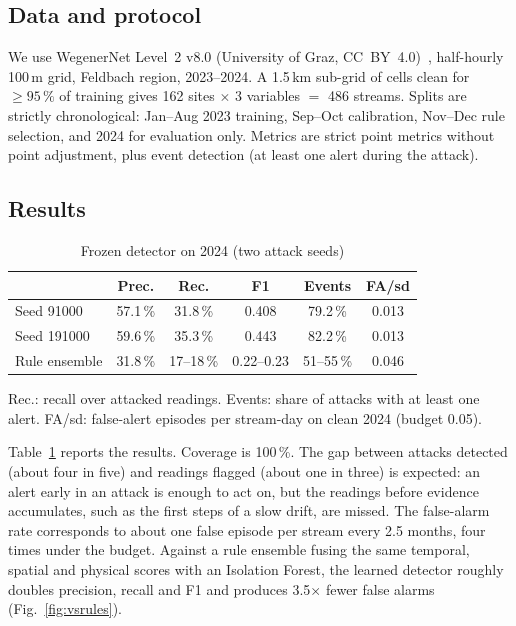 \documentclass[conference]{IEEEtran}
\begin{document}
\subsection{Data and protocol}
We use WegenerNet Level~2 v8.0 (University of Graz, CC~BY~4.0)~\cite{wegenernet}, half-hourly 100\,m grid,
Feldbach region, 2023--2024. A 1.5\,km sub-grid of cells clean for $\geq 95\,\%$ of training gives 162 sites
$\times$ 3 variables $=$ 486 streams. Splits are strictly chronological: Jan--Aug 2023 training, Sep--Oct
calibration, Nov--Dec rule selection, and 2024 for evaluation only. Metrics are strict point metrics without
point adjustment, plus event detection (at least one alert during the attack).

\subsection{Results}

\begin{table}[t]
\caption{Frozen detector on 2024 (two attack seeds)}
\label{tab:results}
\centering
\small
\setlength{\tabcolsep}{3.5pt}
\begin{tabular}{@{}lccccc@{}}
\toprule
 & Prec. & Rec. & F1 & Events & FA/sd \\
\midrule
Seed 91000 & 57.1\,\% & 31.8\,\% & 0.408 & 79.2\,\% & 0.013 \\
Seed 191000 & 59.6\,\% & 35.3\,\% & 0.443 & 82.2\,\% & 0.013 \\
Rule ensemble & 31.8\,\% & 17--18\,\% & 0.22--0.23 & 51--55\,\% & 0.046 \\
\bottomrule
\end{tabular}

\vspace{2pt}
\footnotesize Rec.: recall over attacked readings. Events: share of attacks with at least one alert.
FA/sd: false-alert episodes per stream-day on clean 2024 (budget 0.05).
\end{table}

Table~\ref{tab:results} reports the results. Coverage is 100\,\%. The gap between attacks detected (about four
in five) and readings flagged (about one in three) is expected: an alert early in an attack is enough to act on,
but the readings before evidence accumulates, such as the first steps of a slow drift, are missed. The false-alarm rate corresponds to about
one false episode per stream every 2.5 months, four times under the budget. Against a rule ensemble fusing
the same temporal, spatial and physical scores with an Isolation Forest, the learned detector roughly doubles
precision, recall and F1 and produces 3.5$\times$ fewer false alarms (Fig.~\ref{fig:vsrules}).
\end{document}
